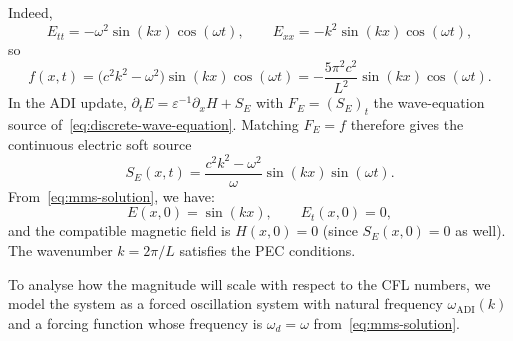 \documentclass{article}
\numberwithin{figure}{section}
\begin{document}
Indeed,
\begin{equation}
    E_{tt}=-\omega^2\sin(kx)\cos(\omega t),\qquad
    E_{xx}=-k^2\sin(kx)\cos(\omega t),
\end{equation}
so
\begin{equation}
    f(x,t)=\bigl(c^2k^2-\omega^2\bigr)\sin(kx)\cos(\omega t)
    =-\frac{5\pi^2 c^2}{L^2}\sin(kx)\cos(\omega t).
    \label{eq:mms-forcing}
\end{equation}
In the ADI update, $\partial_t E=\varepsilon^{-1}\partial_x H+S_E$ with $F_E=(S_E)_t$ the wave-equation source of~\eqref{eq:discrete-wave-equation}. Matching $F_E=f$ therefore gives the continuous electric soft source
\begin{equation}
    S_E(x,t)=\frac{c^2k^2-\omega^2}{\omega}\sin(kx)\sin(\omega t).
    \label{eq:mms-soft-source}
\end{equation}
From~\eqref{eq:mms-solution}, we have:
\begin{equation}
    E(x,0)=\sin(kx),\qquad E_t(x,0)=0,
\end{equation}
and the compatible magnetic field is $H(x,0)=0$ (since $S_E(x,0)=0$ as well). The wavenumber $k=2\pi/L$ satisfies the PEC conditions.

To analyse how the magnitude will scale with respect to the CFL numbers, we model the system as a forced oscillation system with natural frequency $\omega_{\mathrm{ADI}}(k)$ and a forcing function whose frequency is $\omega_d=\omega$ from~\eqref{eq:mms-solution}.
\end{document}
